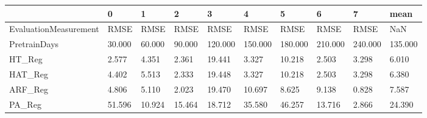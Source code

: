 \begin{tabular}{llllllllll}
\toprule
{} &      0 &      1 &      2 &       3 &       4 &       5 &       6 &       7 &    mean \\
\midrule
EvaluationMeasurement &   RMSE &   RMSE &   RMSE &    RMSE &    RMSE &    RMSE &    RMSE &    RMSE &     NaN \\
PretrainDays          & 30.000 & 60.000 & 90.000 & 120.000 & 150.000 & 180.000 & 210.000 & 240.000 & 135.000 \\
HT\_Reg                &  2.577 &  4.351 &  2.361 &  19.441 &   3.327 &  10.218 &   2.503 &   3.298 &   6.010 \\
HAT\_Reg               &  4.402 &  5.513 &  2.333 &  19.448 &   3.327 &  10.218 &   2.503 &   3.298 &   6.380 \\
ARF\_Reg               &  4.806 &  5.110 &  2.023 &  19.470 &  10.697 &   8.625 &   9.138 &   0.828 &   7.587 \\
PA\_Reg                & 51.596 & 10.924 & 15.464 &  18.712 &  35.580 &  46.257 &  13.716 &   2.866 &  24.390 \\
\bottomrule
\end{tabular}
